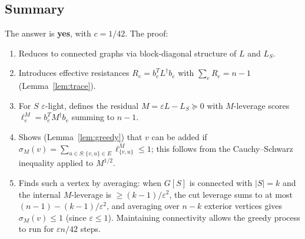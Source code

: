 \documentclass[12pt]{article}
\begin{document}
\subsection*{Summary}

The answer is \textbf{yes}, with $c=1/42$.  The proof:
\begin{enumerate}
  \item Reduces to connected graphs via block-diagonal structure of $L$ and $L_S$.
  \item Introduces effective resistances $R_e = b_e^T L^\dagger b_e$ with
        $\sum_e R_e = n-1$ (Lemma~\ref{lem:trace}).
  \item For $S$ $\varepsilon$-light, defines the residual $M = \varepsilon L - L_S\succeq 0$
        with $M$-leverage scores $\ell_e^M = b_e^T M^\dagger b_e$ summing to $n-1$.
  \item Shows (Lemma~\ref{lem:greedy}) that $v$ can be added if
        $\sigma_M(v)=\sum_{u\in S:\{v,u\}\in E}\ell_{\{v,u\}}^M\leq 1$;
        this follows from the Cauchy--Schwarz inequality applied to $M^{1/2}$.
  \item Finds such a vertex by averaging: when $G[S]$ is connected with
        $|S|=k$ and the internal $M$-leverage is $\geq (k-1)/\varepsilon^2$,
        the cut leverage sums to at most $(n-1)-(k-1)/\varepsilon^2$, and
        averaging over $n-k$ exterior vertices gives $\sigma_M(v)\leq 1$
        (since $\varepsilon\leq 1$). Maintaining connectivity allows the greedy
        process to run for $\varepsilon n/42$ steps.
\end{enumerate}
\end{document}
